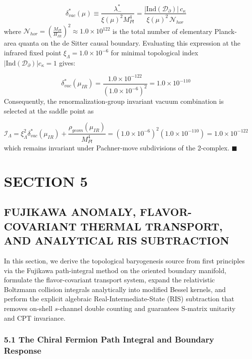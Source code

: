 \documentclass[aps,prd,onecolumn,superscriptaddress,nofootinbib,longbibliography,10pt]{revtex4-2}
\begin{document}
  \[ \delta_{vac}^*(\mu) \equiv \frac{\lambda_-^*}{\xi(\mu)^2 M_{Pl}^4} = \frac{|\text{Ind}(\mathcal{D}_\partial)|\,c_\kappa}{\xi(\mu)^2\,\mathcal{N}_{hor}} \]
  where \(\mathcal{N}_{hor} = \left(\frac{M_{Pl}}{H_{IR}}\right)^2 \approx 1.0 \times 10^{122}\) is the total number of elementary Planck-area quanta on the de Sitter causal boundary. Evaluating this expression at the infrared fixed point \(\xi_\Lambda = 1.0 \times 10^{-6}\) for minimal topological index \(|\text{Ind}(\mathcal{D}_\partial)|c_\kappa = 1\) gives:


  \[ \delta_{vac}^*(\mu_{IR}) = \frac{1.0 \times {10^{-122}}}{(1.0 \times 10^{-6})^2} = 1.0 \times 10^{-110} \]
  Consequently, the renormalization-group invariant vacuum combination is selected at the saddle point as


  \[ \mathcal{I}_\Lambda = \xi_\Lambda^2 \delta_{vac}^*(\mu_{IR}) + \frac{\rho_{geom}(\mu_{IR})}{M_{Pl}^4} = (1.0 \times 10^{-6})^2(1.0 \times 10^{-110}) = 1.0 \times {10^{-122}} \]
  which remains invariant under Pachner-move subdivisions of the 2-complex. \(\blacksquare\)




 

  
\section*{SECTION 5}

  
\subsection*{FUJIKAWA ANOMALY, FLAVOR-COVARIANT THERMAL TRANSPORT, AND ANALYTICAL RIS SUBTRACTION}

  In this section, we derive the topological baryogenesis source from first principles via the Fujikawa path-integral method on the oriented boundary manifold, formulate the flavor-covariant transport system, expand the relativistic Boltzmann collision integrals analytically into modified Bessel kernels, and perform the explicit algebraic Real-Intermediate-State (RIS) subtraction that removes on-shell \(s\)-channel double counting and guarantees S-matrix unitarity and CPT invariance.


  
  
\subsubsection*{5.1 The Chiral Fermion Path Integral and Boundary Response}
\end{document}
